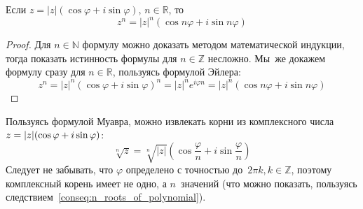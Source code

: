 \begin{theorem}
Если $z = |z|(\cos \varphi + i\sin \varphi)$, $n \in \mathbb R$, то
\begin{equation*}
z^n = |z|^n(\cos n\varphi + i\sin n\varphi)
\end{equation*}
\end{theorem}
\begin{proof}
Для $n \in \mathbb N$ формулу можно доказать методом математической индукции, тогда показать истинность формулы для $n \in \mathbb Z$ несложно.
Мы~же докажем формулу сразу для $n \in \mathbb R$, пользуясь формулой Эйлера:
\begin{equation*}
z^n = |z|^n(\cos \varphi + i\sin \varphi)^n =
|z|^n e^{i\varphi n} = |z|^n (\cos n\varphi + i\sin n\varphi)
\end{equation*}
\end{proof}

Пользуясь формулой Муавра, можно извлекать корни из комплексного числа~$z = |z|(\cos \varphi \opbr+ i\sin \varphi)$:
\begin{equation*}
\sqrt[n]{z} = \sqrt[n]{|z|} \left( \cos \frac{\varphi}n + i\sin \frac{\varphi}n \right)
\end{equation*}
Следует не забывать, что $\varphi$ определено с точностью до~$2\pi k, k \in \mathbb Z$, поэтому комплексный корень имеет не одно, а $n$~значений (что можно показать, пользуясь следствием~\ref{conseq:n_roots_of_polynomial}).